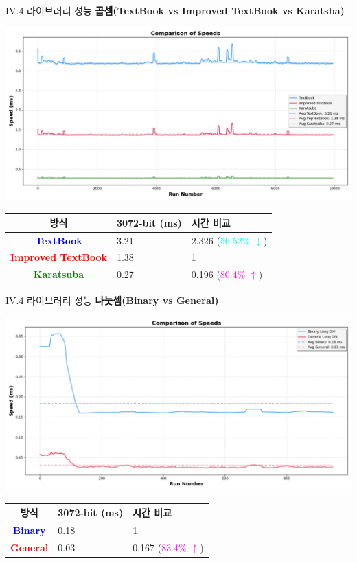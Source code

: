 \documentclass{beamer}
\begin{document}
\begin{frame}{IV.4 라이브러리 성능}
	\alert{\bf 곱셈(TextBook vs Improved TextBook vs Karatsba)}\\
	\begin{center}
		\includegraphics[width=\linewidth,height=.525\textheight]{mul_3072_2.png}
	\end{center}
	\begin{center}
		\begin{tabularx}{\textwidth}{c||XX}
			\hline
			방식 & 3072-bit (ms) & 시간 비교\\
			\midrule
			\textcolor{blue}{\bf TextBook} & 3.21 & 2.326 (\textcolor{cyan}{56.52\% $\downarrow$})\\
			\textcolor{red}{\bf Improved TextBook} & 1.38 & 1\\
			\textcolor{green}{\bf Karatsuba} & 0.27 & 0.196 (\textcolor{magenta}{80.4\% $\uparrow$})\\
			\hline
		\end{tabularx}
	\end{center}
\end{frame}
\begin{frame}{IV.4 라이브러리 성능}
	\alert{\bf 나눗셈(Binary vs General)}\\
	\begin{center}
		\includegraphics[width=\linewidth,height=.525\textheight]{div_3072.png}
	\end{center}
	\begin{center}
		\begin{tabularx}{\textwidth}{c||XX}
			\hline
			방식 & 3072-bit (ms) & 시간 비교\\
			\midrule
			\textcolor{blue}{\bf Binary} & 0.18 & 1 \\
			\textcolor{red}{\bf General} & 0.03 & 0.167 (\textcolor{magenta}{83.4\% $\uparrow$})\\
			\hline
		\end{tabularx}
	\end{center}
\end{frame}
\end{document}
